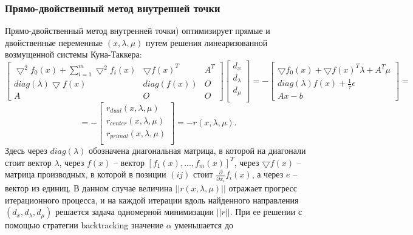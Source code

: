 \documentclass[12pt,a4paper]{article}
\begin{document}
	\subsubsection{Прямо-двойственный метод внутренней точки}
	Прямо-двойственный метод внутренней точки) оптимизирует прямые и двойственные переменные $(x, \lambda, \mu)$ путем
	решения линеаризованной возмущенной системы Куна-Таккера:
	\begin{equation}
		\left[
		\begin{matrix}
			\bigtriangledown^2f_0(x) + \sum_{i=1}^{m}	\bigtriangledown^2f_i(x)&  	\bigtriangledown f(x)^T & A^T\\ 
			diag(\lambda)\bigtriangledown f(x) & diag(f(x))  & O\\
			A & O & O
		\end{matrix}
		\right] 
		\left[
		\begin{matrix}
			d_x \\
			d_\lambda \\
			d_\mu \\
		\end{matrix}
		\right] = - 
		\left[
		\begin{matrix}
			\bigtriangledown f_0(x) + 	\bigtriangledown f(x)^T\lambda + A^T\mu \\  	
			diag(\lambda)f(x) + \frac{1}{\tau}\epsilon\\
			Ax - b
		\end{matrix}
		\right] =
	\end{equation}
	\begin{equation}
		 = - \left[
		\begin{matrix}
			r_{dual}(x, \lambda, \mu) \\
			r_{center}(x, \lambda, \mu) \\
			r_{primal}(x, \lambda, \mu) \\
		\end{matrix}
		\right] = -r(x, \lambda, \mu).
	\end{equation}
	Здесь через $diag(\lambda)$ обозначена диагональная матрица, в которой на диагонали стоит вектор $\lambda$, через $f(x)$ – 
	вектор $[f_1(x), . . . , f_m(x)]^T$, через $\bigtriangledown f(x)$ – матрица производных, в которой в позиции $(ij)$ стоит $\frac{\partial}{\partial x_i}f_i(x)$, а через
	$e$ – вектор из единиц.
	В данном случае величина $||r(x, \lambda, \mu)||$ отражает прогресс итерационного процесса, и на каждой итерации вдоль найденного направления $(d_x, d_\lambda, d_\mu)$ решается задача
	одномерной минимизации $||r||$. При ее решении с помощью стратегии backtracking значение $\alpha$ уменьшается до
\end{document}
